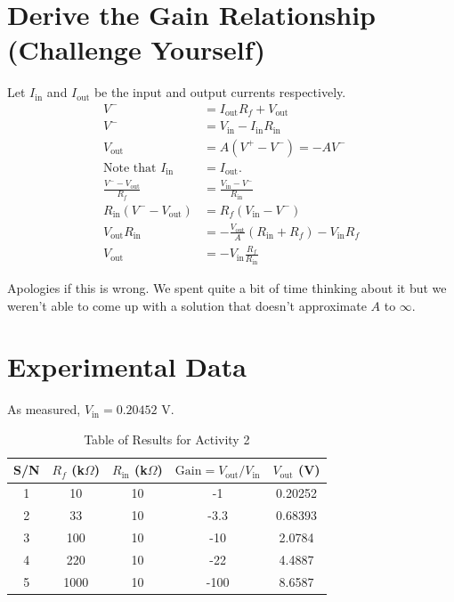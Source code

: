 \documentclass[a4paper,12pt,oneside, tikz]{book}
\begin{document}
\section{Derive the Gain Relationship (Challenge Yourself)}
\begin{tcolorbox}
Let $I_\text{in}$ and $I_\text{out}$ be the input and output currents respectively.
\begin{align*}
    V^- &= I_\text{out}R_f + V_\text{out} \\
    V^- &= V_\text{in} - I_\text{in} R_\text{in} \\
    V_\text{out} &= A \left(V^+ - V^- \right) = -AV^- \\
    \text{Note that }I_\text{in} &= I_\text{out}. \\
    \frac{V^- - V_\text{out}}{R_f} &= \frac{V_\text{in} - V^-}{R_\text{in}} \\
    R_\text{in} (V^- - V_\text{out}) &= R_f (V_\text{in} - V^-) \\
    V_\text{out} R_\text{in} &= -\frac{V_\text{out}}{A}(R_\text{in} + R_f) - V_\text{in} R_f \\
    V_\text{out} &= -V_\text{in} \frac{R_f}{R_\text{in}}
\end{align*}

Apologies if this is wrong. We spent quite a bit of time thinking about it but we weren't able to come up with a solution that doesn't approximate $A$ to $\infty$.
\end{tcolorbox}

\section{Experimental Data}
As measured, $V_\text{in} = 0.20452$ V.

\begin{table}[H]
    \centering
    \begin{tabular}{|c|c|c|c|c|}
        \hline S/N & $R_f$ (k$\Omega$) & $R_\text{in}$ (k$\Omega$) & $\text{Gain} = V_\text{out} / V_\text{in}$ & $V_\text{out}$ (V) \\
        \hline 1 & 10 & 10 & -1 & 0.20252 \\
               2 & 33 & 10 & -3.3 & 0.68393 \\
               3 & 100 & 10 & -10 & 2.0784 \\
               4 & 220 & 10 & -22 & 4.4887 \\
               5 & 1000 & 10 & -100 & 8.6587 \\
        \hline
    \end{tabular}
    \caption{Table of Results for Activity 2}
    \label{tab:act2}
\end{table}
\end{document}
